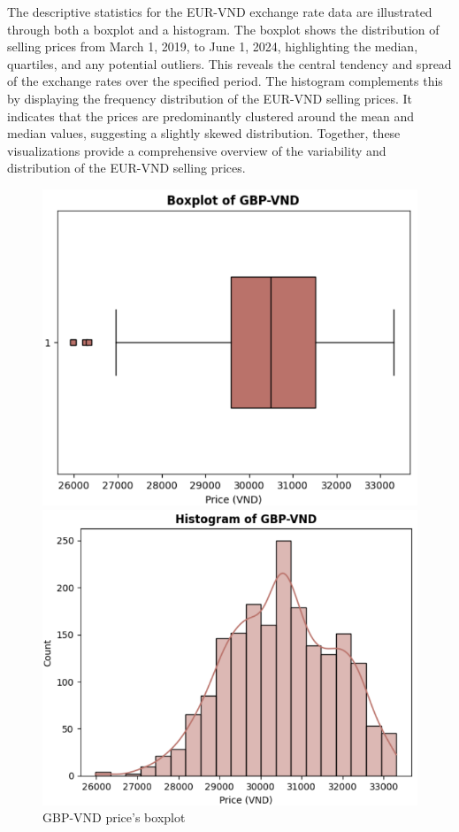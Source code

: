 \documentclass{ieeeojies}
\begin{document}
\justify
The descriptive statistics for the EUR-VND exchange rate data are illustrated through both a boxplot and a histogram. The boxplot shows the distribution of selling prices from March 1, 2019, to June 1, 2024, highlighting the median, quartiles, and any potential outliers. This reveals the central tendency and spread of the exchange rates over the specified period. The histogram complements this by displaying the frequency distribution of the EUR-VND selling prices. It indicates that the prices are predominantly clustered around the mean and median values, suggesting a slightly skewed distribution. Together, these visualizations provide a comprehensive overview of the variability and distribution of the EUR-VND selling prices.

\begin{figure}[H]
    \centering
    \begin{minipage}{0.23\textwidth}
    \centering
    \includegraphics[width=1\textwidth]{Descriptive_statistic/gbp_boxplot.png}
    \caption{GBP-VND price's boxplot}
    \label{fig:1}
    \end{minipage}
    \hfill
    \begin{minipage}{0.23\textwidth}
    \centering
    \includegraphics[width=1\textwidth]{Descriptive_statistic/gbp_histogram.png}

\end{minipage}
\end{figure}
\end{document}

